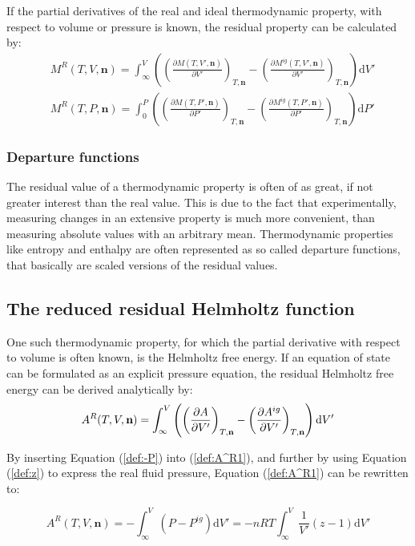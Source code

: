 \documentclass[english]{../thermomemo/thermomemo}
\numberwithin{equation}{section}
\newcommand*{\pder}[2]{\left(\frac{\partial #1}{\partial #2}\right)}
\newcommand*{\reff}[1]{(\ref{#1})}
\begin{document}
If the partial derivatives of the real and ideal thermodynamic property, with respect to volume or pressure is known, the residual property can be calculated by:
\begin{align}
\label{def:M^R(T,V,n)}
& M^R(T,V,\textbf{n}) = \int_\infty ^V \left(\pder{M(T,V',\textbf{n})}{V'}_{T,\textbf{n}} - \pder{M^{ig}(T,V',\textbf{n})}{V'}_{T,\textbf{n}} \right) \mathrm{d}V' \\
& M^R(T,P,\textbf{n}) = \int_0 ^P \left(\pder{M(T,P',\textbf{n})}{P'}_{T,\textbf{n}} - \pder{M^{ig}(T,P',\textbf{n})}{P'}_{T,\textbf{n}} \right) \mathrm{d}P'
\label{def:M^R(T,P,n)}
\end{align}

\subsubsection*{Departure functions}
The residual value of a thermodynamic property is often of as great, if not greater interest than the real value. This is due to the fact that experimentally, measuring changes in an extensive property is much more convenient, than measuring absolute values with an arbitrary mean. Thermodynamic properties like entropy and enthalpy are often represented as so called departure functions, that basically are scaled versions of the residual values.
\subsection{The reduced residual Helmholtz function}
One such thermodynamic property, for which the partial derivative with respect to volume is often known, is the Helmholtz free energy. If an equation of state can be formulated as an explicit pressure equation, the residual Helmholtz free energy can be derived analytically by:
\begin{equation}
\label{def:A^R1}
A^R(T,V,\textbf{n}) = \int_\infty ^V \left(\pder{A}{V'}_{T,\textbf{n}} - \pder{A^{ig}}{V'}_{T,\textbf{n}} \right) \mathrm{d}V' \\
\end{equation}

By inserting Equation \reff{def:-P} into \reff{def:A^R1}, and further by using Equation \reff{def:z} to express the real fluid pressure, Equation \reff{def:A^R1} can be rewritten to:

\begin{equation}
\label{def:A^R2}
A^R(T,V,\textbf{n}) = - \int_\infty ^V \left(P - P^{ig} \right) \mathrm{d}V'  = - nRT \int_\infty ^V \frac{1}{V'} (z-1) \mathrm{d}V'
\end{equation}
\end{document}
